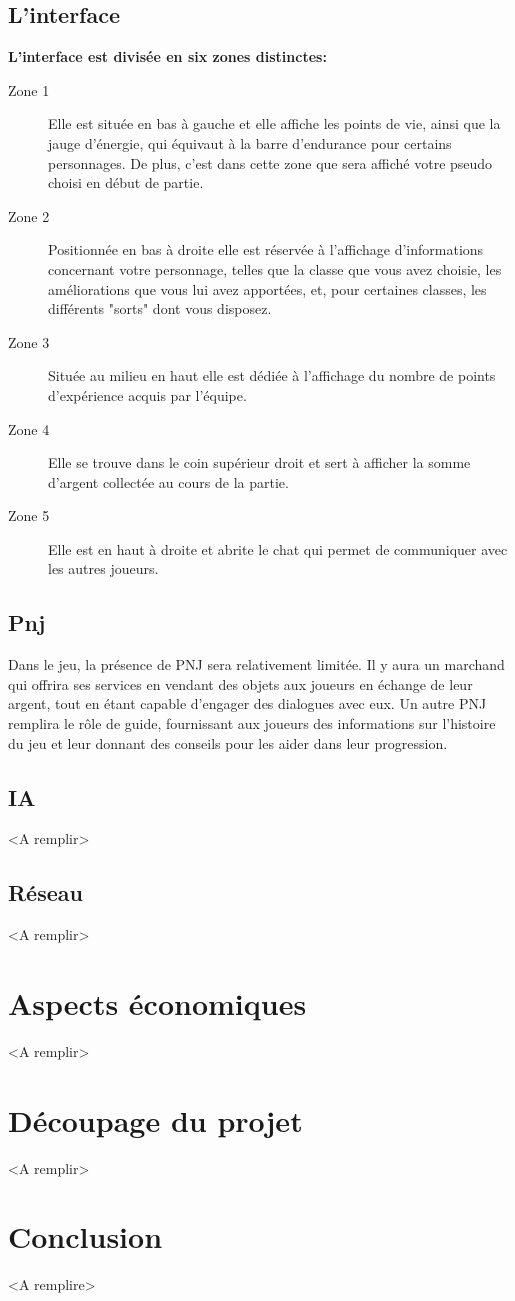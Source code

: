 \documentclass{article}
\begin{document}
\subsection{L'interface}
\textbf{L'interface est divisée en six zones distinctes:}
\begin{description}
\item[Zone 1] Elle est située en bas à gauche et elle affiche les points de vie, ainsi que la jauge d'énergie, qui équivaut à la barre d'endurance pour certains personnages. De plus, c'est dans cette zone que sera affiché votre pseudo choisi en début de partie.
\item[Zone 2] Positionnée en bas à droite elle est réservée à l'affichage d'informations concernant votre personnage, telles que la classe que vous avez choisie, les améliorations que vous lui avez apportées, et, pour certaines classes, les différents "sorts" dont vous disposez.

\item[Zone 3] Située au milieu en haut elle est dédiée à l'affichage du nombre de points d'expérience acquis par l'équipe. 

\item[Zone 4] Elle se trouve dans le coin supérieur droit et sert à afficher la somme d'argent collectée au cours de la partie.

\item[Zone 5] Elle est en haut à droite et abrite le chat qui permet de communiquer avec les autres joueurs.
\end{description}
\subsection{Pnj}
Dans le jeu, la présence de PNJ sera relativement limitée. Il y aura un marchand qui offrira ses services en vendant des objets aux joueurs en échange de leur argent, tout en étant capable d'engager des dialogues avec eux. Un autre PNJ remplira le rôle de guide, fournissant aux joueurs des informations sur l'histoire du jeu et leur donnant des conseils pour les aider dans leur progression.
\subsection{IA}
<A remplir>
\subsection{Réseau}
<A remplir>
\section{Aspects économiques}
<A remplir>
\section{Découpage du projet}
<A remplir>
\section{Conclusion}
<A remplire>
\end{document}
